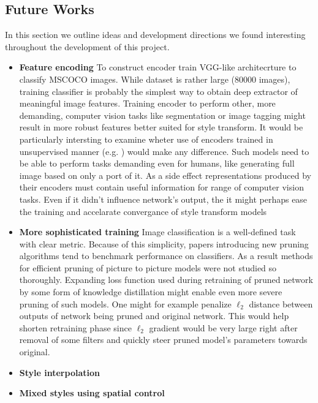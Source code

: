 \documentclass[../Main.tex]{subfiles}
\begin{document}
\subsection{Future Works}
In this section we outline ideas and development directions we found interesting
throughout the development of this project.
\begin{itemize}
\item \textbf{Feature encoding}
    To construct encoder \cite{Li2018} train VGG-like architecrture to classify 
    MSCOCO images. While dataset is rather large (80000 images), training classifier
    is probably the simplest way to obtain deep extractor of meaningful image features.
    Training encoder to perform other, more demanding, computer vision tasks like 
    segmentation or image tagging might result in more robust features better suited
    for style transform. It would be particularly intersting to examine wheter use of encoders
    trained in unsupervised manner (e.g. \cite{CPC, CPCv2}) would make any difference.
    Such models need to be able to perform tasks demanding even for humans, like generating
    full image based on only a port of it. As a side effect representations produced by their
    encoders must contain useful information for range of computer vision tasks.
    Even if it didn't influence network's output, the it might perhaps ease the training
    and accelarate convergance of style transform models
\item \textbf{More sophisticated training}
    Image classification is a well-defined task with clear metric.
    Because of this simplicity, papers introducing new pruning algorithms tend to 
    benchmark performance on classifiers. As a result methods for efficient pruning of
    picture to picture models were not studied so thoroughly. Expanding loss function used during
    retraining of pruned network by some form of knowledge distillation might enable
    even more severe pruning of such models. One might for example penalize $\ell_2$
    distance between outputs of network being pruned and original network.
    This would help shorten retraining phase since $\ell_2$ gradient
    would be very large right after removal of some filters and quickly steer pruned
    model's parameters towards original.
\item \textbf{Style interpolation}
\item \textbf{Mixed styles using spatial control}
    
    
    
\end{itemize}

\biblio %
\end{document}
